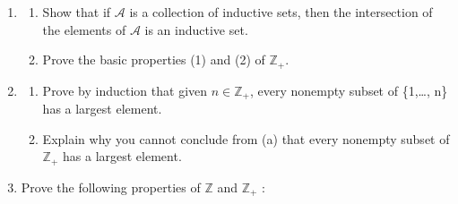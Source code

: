 \begin{enumerate}[itemsep=0.4em, parsep=0pt, topsep=0pt, partopsep=0pt, leftmargin=*, label=\arabic*., ref=\arabic*]
  \begin{enumerate}[itemsep=0.2em, parsep=0pt, topsep=0pt, partopsep=0pt, leftmargin=*, label=(\alph*), align=left]
  \item \(x > y\) and \(w > z \Rightarrow x + w > y + z\).
  \item \(x > 0\) and \(y > 0 \Rightarrow x + y > 0\) and \(x \cdot y > 0\).
  \item \(x > 0 \Leftrightarrow - x < 0\).
  \item \(x > y \Leftrightarrow - x < - y\).
  \item \(x > y\) and \(z < 0 \Rightarrow {xz} < {yz}\).
  \item \(x \neq 0 \Rightarrow {x}^{2} > 0\), where \(x^{2} = x \cdot x\).
  \item \(- 1 < 0 < 1\)
  \item \({xy} > 0 \Leftrightarrow x\) and \(y\) are both positive or both negative.
  \item \(x > 0 \Rightarrow 1/x > 0\).
  \item \(x > y > 0 \Rightarrow 1/x < 1/y\).
  \item \(x < y \Rightarrow x < ({x + y}) /2 < y\).
\end{enumerate}
\item
  \begin{enumerate}[itemsep=0.2em, parsep=0pt, topsep=0pt, partopsep=0pt, leftmargin=*, label=(\alph*), align=left]
  \item Show that if \(\mathcal{A}\) is a collection of inductive sets, then the intersection of the elements of \(\mathcal{A}\) is an inductive set.
  \item Prove the basic properties (1) and (2) of \(\mathbb{Z}_{+}\).
  \end{enumerate}
\item
  \begin{enumerate}[itemsep=0.2em, parsep=0pt, topsep=0pt, partopsep=0pt, leftmargin=*, label=(\alph*), align=left]
  \item Prove by induction that given \(n \in {\mathbb{Z}}_{+}\), every nonempty subset of \{1,\ldots, n\} has a largest element.
  \item Explain why you cannot conclude from (a) that every nonempty subset of \(\mathbb{Z}_{+}\) has a largest element.
  \end{enumerate}
\item Prove the following properties of \(\mathbb{Z}\) and \(\mathbb{Z}_{+}\) :
  \begin{enumerate}[itemsep=0.2em, parsep=0pt, topsep=0pt, partopsep=0pt, leftmargin=*, label=(\alph*), align=left]

\end{enumerate}
\end{enumerate}
